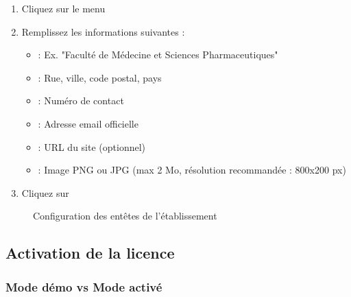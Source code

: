 \begin{enumerate}[leftmargin=*]
    \item Cliquez sur le menu 
    \item Remplissez les informations suivantes :

    \begin{tcolorbox}[colback=blue!5!white,colframe=blue!75!black,title=Informations requises]
    \begin{itemize}[leftmargin=*]
        \item {} : Ex. "Faculté de Médecine et Sciences Pharmaceutiques"
        \item {} : Rue, ville, code postal, pays
        \item {} : Numéro de contact
        \item {} : Adresse email officielle
        \item {} : URL du site (optionnel)
        \item {} : Image PNG ou JPG (max 2 Mo, résolution recommandée : 800x200 px)
    \end{itemize}
    \end{tcolorbox}

    \item Cliquez sur 
\end{enumerate}

\begin{figure}[h]
    \centering
    \caption{Configuration des entêtes de l'établissement}
\end{figure}

\subsection{Activation de la licence}

\subsubsection{Mode démo vs Mode activé}

